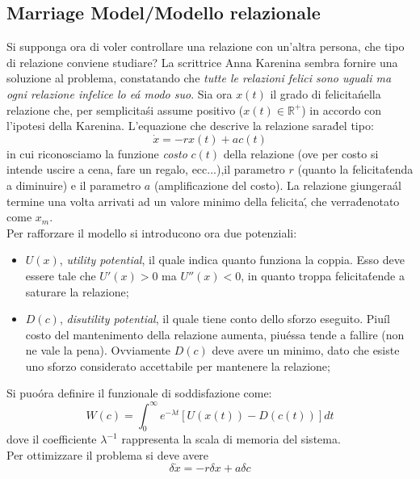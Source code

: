 \documentclass[12pt, a4paper]{book}
\theoremstyle{theorem}
\begin{document}
			\subsection{Marriage Model/Modello relazionale}
				Si supponga ora di voler controllare una relazione con un'altra persona, che tipo di relazione conviene studiare?
				La scrittrice Anna Karenina sembra fornire una soluzione al problema, constatando che \emph{tutte le relazioni felici sono uguali ma ogni relazione infelice lo e\' a modo suo}.
				Sia ora $x(t)$ il grado di felicita\' nella relazione che, per semplicita\' si assume positivo ($x(t)\in\mathbb{R}^{+}$) in accordo con l'ipotesi della Karenina.
				L'equazione che descrive la relazione sara\' del tipo:
				\begin{equation}
					\dot{x}=-rx(t)+ac(t)
				\end{equation}
				in cui riconosciamo la funzione \emph{costo} $c(t)$ della relazione (ove per costo si intende uscire a cena, fare un regalo, ecc...),il parametro $r$ (quanto la felicita\' tenda a diminuire) e il parametro $a$ (amplificazione del costo).
				La relazione giungera\' al termine una volta arrivati ad un valore minimo della felicita\', che verra\' denotato come $x_{m}$.
				\\Per rafforzare il modello si introducono ora due potenziali:
				\begin{itemize}
					\item $U(x)$, \emph{utility potential}, il quale indica quanto funziona la coppia.
						Esso deve essere tale che $U'(x)>0$ ma $U''(x)<0$, in quanto troppa felicita\' tende a saturare la relazione;
					\item $D(c)$, \emph{disutility potential}, il quale tiene conto dello sforzo eseguito.
						Piu\' il costo del mantenimento della relazione aumenta, piu\' essa tende a fallire (non ne vale la pena).
						Ovviamente $D(c)$ deve avere un minimo, dato che esiste uno sforzo considerato accettabile per mantenere la relazione;
				\end{itemize}
				Si puo\' ora definire il funzionale di soddisfazione come:
				\begin{equation*}
					W(c)=\int_{0}^{\infty}e^{-\lambda t}\left[U\left(x(t)\right)-D\left(c(t)\right)\right]dt
				\end{equation*}
				dove il coefficiente $\lambda^{-1}$ rappresenta la scala di memoria del sistema.
				\\Per ottimizzare il problema si deve avere
				\begin{equation*}
					\delta\dot{x}=-r\delta x+a\delta c
				\end{equation*}
\end{document}
